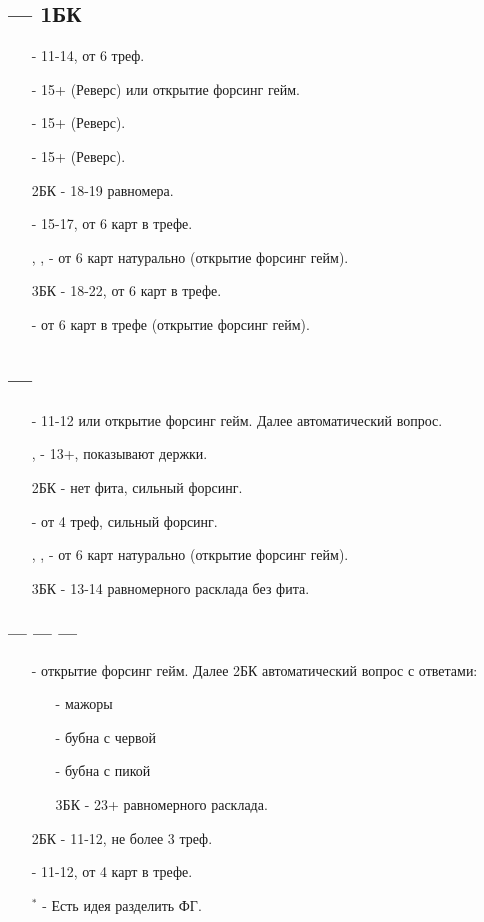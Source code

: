 \documentclass{article}
\begin{document}
\subsection{ --- 1БК}
\begin{enumerate}
    \item[\cl{2}] - 11-14, от 6 треф.
    \item[\di{2}] - 15+  (Реверс) или открытие форсинг гейм.
    \item[\he{2}] - 15+  (Реверс).
    \item[\sp{2}] - 15+  (Реверс).
    \item[2БК] - 18-19 равномера.
    \item[\cl{3}] - 15-17, от 6 карт в трефе.
    \item[\di{3}, \he{3}, \sp{3}] - от 6 карт натурально (открытие форсинг гейм).
    \item[3БК] - 18-22, от 6 карт в трефе.
    \item[\cl{4}] - от 6 карт в трефе (открытие форсинг гейм).
\end{enumerate}
\subsection{ --- }
\begin{enumerate}
    \item[\di{2}] - 11-12 или открытие форсинг гейм. Далее  автоматический вопрос.
    \item[\he{2}, \sp{2}] - 13+, показывают держки.
    \item[2БК] - нет фита, сильный форсинг.
    \item[\cl{3}] - от 4 треф, сильный форсинг.
    \item[\di{3}, \he{3}, \sp{3}] - от 6 карт натурально (открытие форсинг гейм).
    \item[3БК] - 13-14 равномерного расклада без фита.
\end{enumerate}
\subsubsection{ ---  ---  --- }
\begin{enumerate}
    \item[\sp{2}] - открытие форсинг гейм. Далее 2БК автоматический вопрос с ответами:
    \begin{enumerate}
        \item[\cl{3}] - мажоры
        \item[\di{3}] - бубна с червой
        \item[\he{3}] - бубна с пикой
        \item[3БК] - 23+ равномерного расклада.
    \end{enumerate}
    \item[2БК] - 11-12, не более 3 треф.
    \item[\cl{3}] - 11-12, от 4 карт в трефе.
    \item[$^*$] - Есть идея разделить ФГ.
\end{enumerate}
\end{document}
